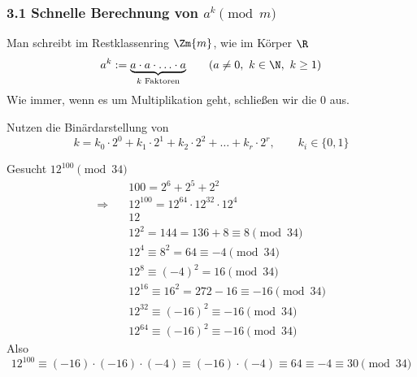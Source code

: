 \subsubsection*{3.1 Schnelle Berechnung von $a^k \pmod{m}$}


Man schreibt im Restklassenring $\Zm{m}$, wie im Körper $\R$
\[
  a^k := \underbrace{a \cdot a \cdot \ldots \cdot a}_{k \text{ Faktoren}} \qquad (a \neq 0,\ k \in \N,\ k \geq 1)
\]
Wie immer, wenn es um Multiplikation geht, schließen wir die 0 aus.

\begin{algorithmus}
Nutzen die Binärdarstellung von
\[
  k = k_0 \cdot 2^0 + k_1 \cdot 2^1 + k_2 \cdot 2^2 + \ldots + k_r \cdot 2^r , \qquad k_i \in \{0, 1\}
\]
\end{algorithmus}

\begin{beispiel}
Gesucht $12^{100} \pmod{34}$
\begin{align*}
  & 100 = 2^6 + 2^5 + 2^2 \\
  \Rightarrow\quad & 12^{100} = 12^{64} \cdot 12^{32} \cdot 12^{4} \\
  & 12 \\
  & 12^2 = 144 = 136 + 8 \equiv 8 \pmod{34} \\
  & 12^4 \equiv 8^2 = 64 \equiv -4 \pmod{34} \\
  & 12^8 \equiv (-4)^2 = 16 \pmod{34} \\
  & 12^{16} \equiv 16^2 = 272 - 16 \equiv -16 \pmod{34} \\
  & 12^{32} \equiv (-16)^2 \equiv -16 \pmod{34} \\
  & 12^{64} \equiv (-16)^2 \equiv -16 \pmod{34}
\end{align*}
Also
\[
  12^{100} \equiv (-16) \cdot (-16) \cdot (-4) \equiv (-16) \cdot (-4) \equiv 64 \equiv -4 \equiv 30 \pmod{34}
\]
\end{beispiel}
